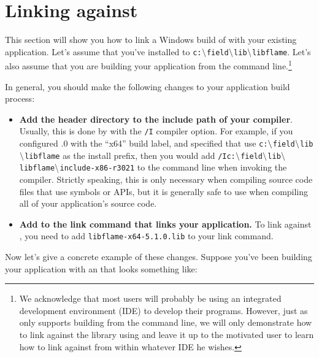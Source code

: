 \section{Linking against \libflame}
\label{sec:linking-win}


This section will show you how to link a Windows build of \libflame with
your existing application.
Let's assume that you've installed \libflame to
{\tt c:$\backslash$field$\backslash$lib$\backslash$libflame}.
Let's also assume that you are building your application from the command
line.\footnote{
We acknowledge that most users will probably be using an integrated
development environment (IDE) to develop their programs.
However, just as \libflame only supports building from the command line,
we will only demonstrate how to link against the library using \nmake and
leave it up to the motivated user to learn how to link against \libflame
from within whatever IDE he wishes.}

In general, you should make the following changes to your application build
process:
\begin{itemize}
\item
{\bf Add the \libflame header directory to the include path of your compiler}.
Usually, this is done by with the {\tt /I} compiler option.
For example, if you configured .0 with the ``x64'' build label,
and specified that \configurecmd use
{\tt c:$\backslash$field$\backslash$lib$\backslash$libflame} as the
install prefix, then you would add
{\tt /Ic:$\backslash$field$\backslash$lib$\backslash$libflame$\backslash$include-x86-r3021} to the command
line when invoking the compiler.
Strictly speaking, this is only necessary when compiling source code files
that use \libflame symbols or APIs, but it is generally safe to use when compiling
all of your application's source code.
\item
{\bf Add \libflame to the link command that links your application.}
To link against \libflamens, you need to add
{\tt libflame-x64-5.1.0.lib} to your link command.
\end{itemize}

Now let's give a concrete example of these changes.
Suppose you've been building your application with an \nmake \makefile that
looks something like:

